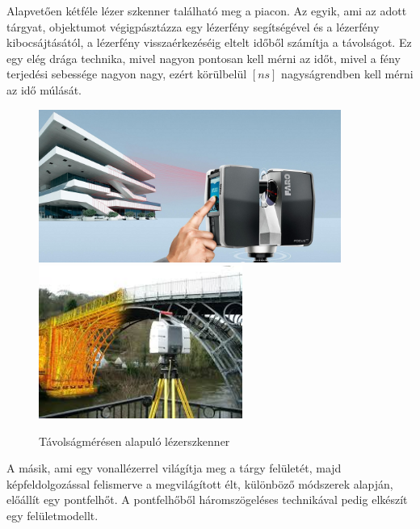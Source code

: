 \documentclass[12pt,a4paper]{article}
\begin{document}
	Alapvetően kétféle lézer szkenner található meg a piacon. Az egyik, ami az adott tárgyat, objektumot végigpásztázza egy lézerfény segítségével és a lézerfény kibocsájtásától, a lézerfény visszaérkezéséig eltelt időből számítja a távolságot. Ez egy elég drága technika, mivel nagyon pontosan kell mérni az időt, mivel a fény terjedési sebessége nagyon nagy, ezért körülbelül $[ns]$ nagyságrendben kell mérni az idő múlását.\\[10pt]
	\begin{figure}[h!]
		\begin{center}
			\includegraphics[height=5cm]{images/Faro_Building_Scan}
			\includegraphics[height=5cm]{images/Bridge_Scan}
		\end{center}
		\caption{Távolságmérésen alapuló lézerszkenner\cite{FaroBuildingScan}\cite{BridgeScan}}
	\end{figure}
	A másik, ami egy vonallézerrel világítja meg a tárgy felületét, majd képfeldolgozással felismerve a megvilágított élt, különböző módszerek alapján, előállít egy pontfelhőt. A pontfelhőből háromszögeléses technikával pedig elkészít egy felületmodellt.\\[10pt]
\end{document}
